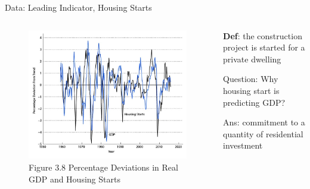 \documentclass[11pt,aspectratio=169,usenames,dvipsnames]{beamer}
\let\tempone\itemize
\let\temptwo\enditemize
\renewenvironment{itemize}{\tempone\addtolength{\itemsep}{\fill}}{\temptwo}
\begin{document}
\begin{frame}{Data: Leading Indicator, Housing Starts}
\label{slide:Data__Leading_Indicator}
    \begin{columns}
        \begin{column}{0.5\textwidth}
            \begin{figure}
                \caption{Figure 3.8  Percentage Deviations in Real GDP and Housing Starts}
                \includegraphics[width=\textwidth]{./figures/Figure3_8.jpg}
            \end{figure}
        \end{column}
        \begin{column}{0.5\textwidth}
            \begin{itemize}
                \item \textbf{Def}: the construction project is started for a private dwelling
                \item \alert{Question}: Why housing start is predicting GDP?
                \item Ans: \alert{commitment} to a quantity of residential \alert{investment}
            \end{itemize}
        \end{column}
    \end{columns}
\end{frame}
\end{document}
